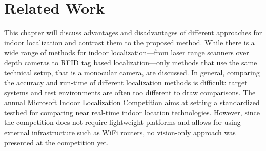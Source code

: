 \chapter{Related Work}
\label{chap:relatedwork}

This chapter will discuss advantages and disadvantages of different approaches for indoor localization and
contrast them to the proposed method. While there is a wide range of methods for indoor localization---from laser range scanners over depth cameras to RFID tag based localization---only methods that use the same technical setup, that is a monocular camera, are discussed. In general, comparing the accuracy and run-time of different localization methods is difficult: target systems and test environments are often too different to draw comparisons. The annual Microsoft Indoor Localization Competition aims at setting a standardized testbed for comparing near real-time indoor location technologies. However, since the competition does not require lightweight platforms and allows for using external infrastructure such as WiFi routers, no vision-only approach was presented at the competition yet.
